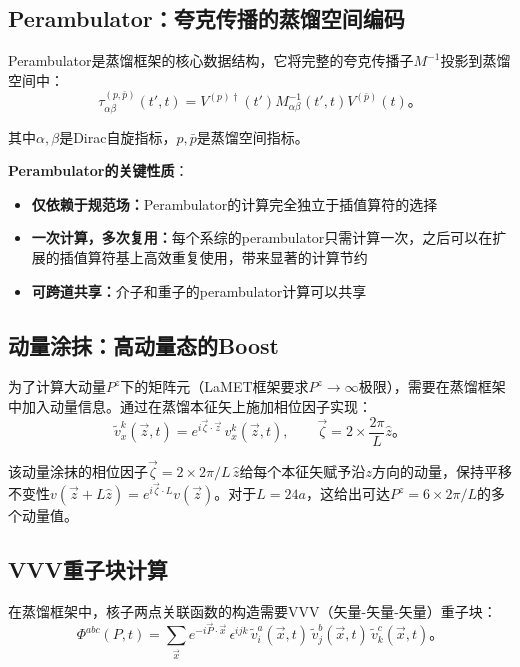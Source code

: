 \documentclass[12pt,a4paper]{ctexart}
\theoremstyle{definition}
\begin{document}
\subsection{Perambulator：夸克传播的蒸馏空间编码}

Perambulator是蒸馏框架的核心数据结构，它将完整的夸克传播子$M^{-1}$投影到蒸馏空间中\cite{NoteGluonPDFs,Peardon2009,本库补充5}：
\begin{equation}
\boxed{\tau_{\alpha\beta}^{(p,\bar{p})}(t',t) = V^{(p)\dagger}(t') M^{-1}_{\alpha\beta}(t',t) V^{(\bar{p})}(t)}。
\label{eq:perambulator}
\end{equation}

其中$\alpha,\beta$是Dirac自旋指标，$p,\bar{p}$是蒸馏空间指标。

\textbf{Perambulator的关键性质}\cite{Peardon2009,Egerer2021a}：
\begin{itemize}
    \item \textbf{仅依赖于规范场：}Perambulator的计算完全独立于插值算符的选择
    \item \textbf{一次计算，多次复用：}每个系综的perambulator只需计算一次，之后可以在扩展的插值算符基上高效重复使用，带来显著的计算节约
    \item \textbf{可跨道共享：}介子和重子的perambulator计算可以共享
\end{itemize}

\subsection{动量涂抹：高动量态的Boost}

为了计算大动量$P^z$下的矩阵元（LaMET框架要求$P^z\to\infty$极限），需要在蒸馏框架中加入动量信息。通过在蒸馏本征矢上施加相位因子实现\cite{Egerer2021a,NoteGluonPDFs}：
\begin{equation}
\boxed{\tilde{v}_x^k(\vec{z},t) = e^{i\vec{\zeta}\cdot\vec{z}} \, v_x^k(\vec{z},t)}, \qquad
\vec{\zeta} = 2 \times \frac{2\pi}{L} \hat{z}。
\label{eq:mom_smear}
\end{equation}

该动量涂抹的相位因子$\vec{\zeta}=2\times2\pi/L\,\hat{z}$给每个本征矢赋予沿$z$方向的动量，保持平移不变性$v(\vec{z}+L\hat{z})=e^{i\vec{\zeta}\cdot L}v(\vec{z})$。对于$L=24a$，这给出可达$P^z=6\times2\pi/L$的多个动量值。

\subsection{VVV重子块计算}

在蒸馏框架中，核子两点关联函数的构造需要VVV（矢量-矢量-矢量）重子块\cite{NoteGluonPDFs,代码解析}：
\begin{equation}
\boxed{\Phi^{abc}(P,t) = \sum_{\vec{x}} e^{-i\vec{P}\cdot\vec{x}} \, \epsilon^{ijk} \, \tilde{v}_i^a(\vec{x},t) \, \tilde{v}_j^b(\vec{x},t) \, \tilde{v}_k^c(\vec{x},t)}。
\label{eq:VVV}
\end{equation}
\end{document}
